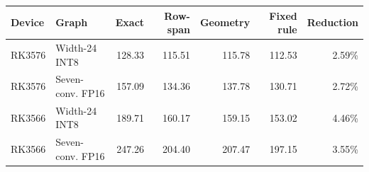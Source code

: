 \begin{tabular}{llrrrrr}
\toprule
Device & Graph & Exact & Row-span & Geometry & Fixed rule & Reduction \\
\midrule
RK3576 & Width-24 INT8 & 128.33 & 115.51 & 115.78 & 112.53 & 2.59\% \\
RK3576 & Seven-conv. FP16 & 157.09 & 134.36 & 137.78 & 130.71 & 2.72\% \\
RK3566 & Width-24 INT8 & 189.71 & 160.17 & 159.15 & 153.02 & 4.46\% \\
RK3566 & Seven-conv. FP16 & 247.26 & 204.40 & 207.47 & 197.15 & 3.55\% \\
\bottomrule
\end{tabular}
